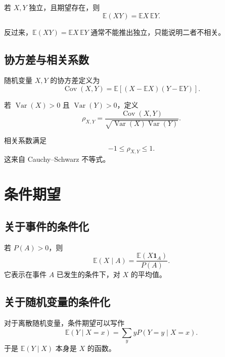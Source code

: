 \begin{proposition}
若 $X,Y$ 独立，且期望存在，则
\[
    \mathbb{E}(XY)=\mathbb{E}X\,\mathbb{E}Y.
\]
\end{proposition}

\begin{remark}
反过来，$\mathbb{E}(XY)=\mathbb{E}X\,\mathbb{E}Y$ 通常不能推出独立，只能说明二者不相关。
\end{remark}

\subsection{协方差与相关系数}

\begin{definition}[协方差]
随机变量 $X,Y$ 的协方差定义为
\[
    \operatorname{Cov}(X,Y)
    =\mathbb{E}\left[(X-\mathbb{E}X)(Y-\mathbb{E}Y)\right].
\]
\end{definition}

\begin{definition}[相关系数]
若 $\operatorname{Var}(X)>0$ 且 $\operatorname{Var}(Y)>0$，定义
\[
    \rho_{X,Y}=\frac{\operatorname{Cov}(X,Y)}{\sqrt{\operatorname{Var}(X)\operatorname{Var}(Y)}}.
\]
\end{definition}

\begin{proposition}
相关系数满足
\[
    -1\le\rho_{X,Y}\le1.
\]
这来自 Cauchy--Schwarz 不等式。
\end{proposition}

\section{条件期望}

\subsection{关于事件的条件化}

若 $P(A)>0$，则
\[
    \mathbb{E}(X\mid A)=\frac{\mathbb{E}(X\mathbf{1}_A)}{P(A)}.
\]
它表示在事件 $A$ 已发生的条件下，对 $X$ 的平均值。

\subsection{关于随机变量的条件化}

对于离散随机变量，条件期望可以写作
\[
    \mathbb{E}(Y\mid X=x)=\sum_y yP(Y=y\mid X=x).
\]
于是 $\mathbb{E}(Y\mid X)$ 本身是 $X$ 的函数。

